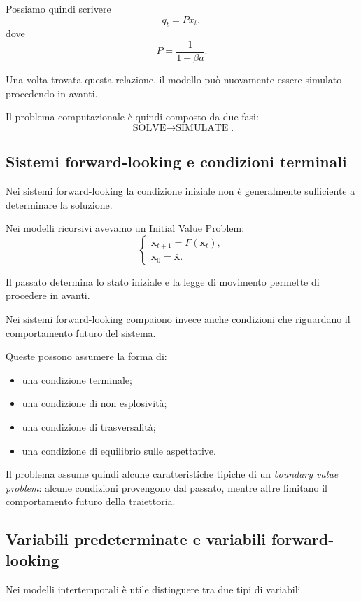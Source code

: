 \documentclass{book}
\begin{document}
Possiamo quindi scrivere
\[
q_t=P x_t,
\]
dove
\[
P=\frac{1}{1-\beta a}.
\]

Una volta trovata questa relazione, il modello può nuovamente essere
simulato procedendo in avanti.

Il problema computazionale è quindi composto da due fasi:
\[
\boxed{
\text{SOLVE}
\longrightarrow
\text{SIMULATE}
}.
\]


\subsection{Sistemi forward-looking e condizioni terminali}

Nei sistemi forward-looking la condizione iniziale non è generalmente
sufficiente a determinare la soluzione.

Nei modelli ricorsivi avevamo un Initial Value Problem:
\[
\begin{cases}
\mathbf{x}_{t+1}=F(\mathbf{x}_t),\\
\mathbf{x}_0=\bar{\mathbf{x}}.
\end{cases}
\]

Il passato determina lo stato iniziale e la legge di movimento permette
di procedere in avanti.

Nei sistemi forward-looking compaiono invece anche condizioni che
riguardano il comportamento futuro del sistema.

Queste possono assumere la forma di:

\begin{itemize}
    \item una condizione terminale;
    \item una condizione di non esplosività;
    \item una condizione di trasversalità;
    \item una condizione di equilibrio sulle aspettative.
\end{itemize}

Il problema assume quindi alcune caratteristiche tipiche di un
\emph{boundary value problem}: alcune condizioni provengono dal passato,
mentre altre limitano il comportamento futuro della traiettoria.


\subsection{Variabili predeterminate e variabili forward-looking}

Nei modelli intertemporali è utile distinguere tra due tipi di variabili.
\end{document}
